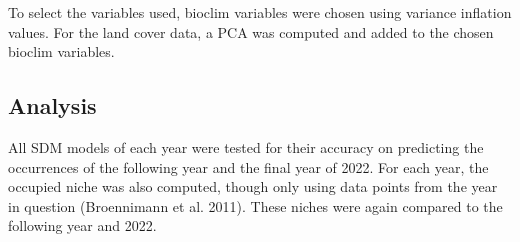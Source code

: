 \documentclass[12pt]{article}
\begin{document}
To select the variables used, bioclim variables were chosen using variance inflation values. 
For the land cover data, a PCA was computed and added to the chosen bioclim variables.

\subsection{Analysis}
All SDM models of each year were tested for their accuracy on predicting the occurrences of the following year and the final year of 2022. 
For each year, the occupied niche was also computed, though only using data points from the year in question (Broennimann et al. 2011). 
These niches were again compared to the following year and 2022.
\end{document}
